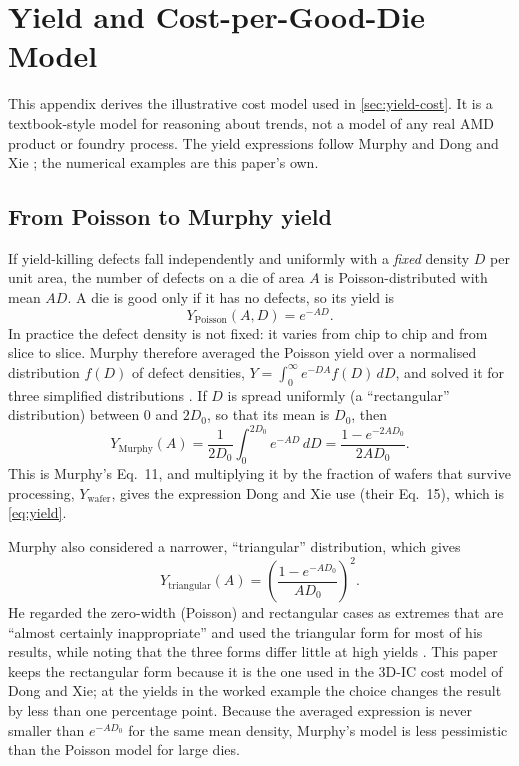\clearpage
\section{Yield and Cost-per-Good-Die Model}
\label{app:yield-cost}

This appendix derives the illustrative cost model used in \cref{sec:yield-cost}. It is a textbook-style model for reasoning about trends, not a model of any real AMD product or foundry process. The yield expressions follow Murphy \cite{murphyCostsizeOptimaMonolithic1964} and Dong and Xie \cite{dongSystemlevelCostAnalysis2009}; the numerical examples are this paper's own.

\subsection{From Poisson to Murphy yield}
If yield-killing defects fall independently and uniformly with a \emph{fixed} density $D$ per unit area, the number of defects on a die of area $A$ is Poisson-distributed with mean $AD$. A die is good only if it has no defects, so its yield is
\begin{equation*}
  Y_{\mathrm{Poisson}}(A, D) = e^{-AD}.
\end{equation*}
In practice the defect density is not fixed: it varies from chip to chip and from slice to slice. Murphy therefore averaged the Poisson yield over a normalised distribution $f(D)$ of defect densities, $Y = \int_0^\infty e^{-DA} f(D)\,dD$, and solved it for three simplified distributions \cite[Eqs.~7--11]{murphyCostsizeOptimaMonolithic1964}. If $D$ is spread uniformly (a ``rectangular'' distribution) between $0$ and $2D_0$, so that its mean is $D_0$, then
\begin{equation*}
  Y_{\mathrm{Murphy}}(A) = \frac{1}{2D_0}\int_{0}^{2D_0} e^{-AD}\,dD = \frac{1 - e^{-2AD_0}}{2AD_0}.
\end{equation*}
This is Murphy's Eq.~11, and multiplying it by the fraction of wafers that survive processing, $Y_{\mathrm{wafer}}$, gives the expression Dong and Xie use (their Eq.~15), which is \cref{eq:yield}.

Murphy also considered a narrower, ``triangular'' distribution, which gives
\begin{equation*}
  Y_{\mathrm{triangular}}(A) = \left(\frac{1 - e^{-AD_0}}{AD_0}\right)^{2}.
\end{equation*}
He regarded the zero-width (Poisson) and rectangular cases as extremes that are ``almost certainly inappropriate'' and used the triangular form for most of his results, while noting that the three forms differ little at high yields \cite[p.~1539]{murphyCostsizeOptimaMonolithic1964}. This paper keeps the rectangular form because it is the one used in the 3D-IC cost model of Dong and Xie; at the yields in the worked example the choice changes the result by less than one percentage point. Because the averaged expression is never smaller than $e^{-AD_0}$ for the same mean density, Murphy's model is less pessimistic than the Poisson model for large dies.

